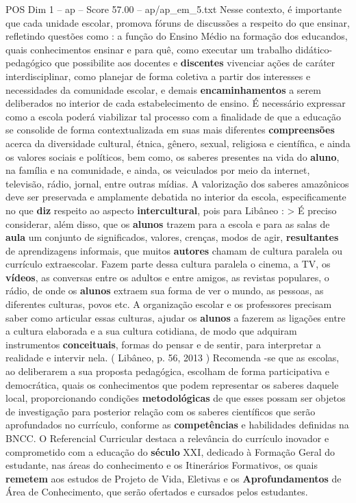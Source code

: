 \begin{textsample}{POS Dim 1 – ap – Score 57.00 – ap/ap\_em\_5.txt}
Nesse contexto, é importante que cada unidade escolar, promova fóruns de discussões a respeito do que ensinar, refletindo questões como : a função do Ensino Médio na formação dos educandos, quais conhecimentos ensinar e para quê, como executar um trabalho didático-pedagógico que possibilite aos docentes e \textbf{discentes} vivenciar ações de caráter interdisciplinar, como planejar de forma coletiva a partir dos interesses e necessidades da comunidade escolar, e demais \textbf{encaminhamentos} a serem deliberados no interior de cada estabelecimento de ensino.
É necessário expressar como a escola poderá viabilizar tal processo com a finalidade de que a educação se consolide de forma contextualizada em suas mais diferentes \textbf{compreensões} acerca da diversidade cultural, étnica, gênero, sexual, religiosa e científica, e ainda os valores sociais e políticos, bem como, os saberes presentes na vida do \textbf{aluno}, na família e na comunidade, e ainda, os veiculados por meio da internet, televisão, rádio, jornal, entre outras mídias.
A valorização dos saberes amazônicos deve ser preservada e amplamente debatida no interior da escola, especificamente no que \textbf{diz} respeito ao aspecto \textbf{intercultural}, pois para Libâneo : > É preciso considerar, além disso, que os \textbf{alunos} trazem para a escola e para as salas de \textbf{aula} um conjunto de significados, valores, crenças, modos de agir, \textbf{resultantes} de aprendizagens informais, que muitos \textbf{autores} chamam de cultura paralela ou currículo extraescolar.
Fazem parte dessa cultura paralela o cinema, a TV, os \textbf{vídeos}, as conversas entre os adultos e entre amigos, as revistas populares, o rádio, de onde os \textbf{alunos} extraem sua forma de ver o mundo, as pessoas, as diferentes culturas, povos etc.
A organização escolar e os professores precisam saber como articular essas culturas, ajudar os \textbf{alunos} a fazerem as ligações entre a cultura elaborada e a sua cultura cotidiana, de modo que adquiram instrumentos \textbf{conceituais}, formas do pensar e de sentir, para interpretar a realidade e intervir nela. ( Libâneo, p. 56, 2013 ) Recomenda -se que as escolas, ao deliberarem a sua proposta pedagógica, escolham de forma participativa e democrática, quais os conhecimentos que podem representar os saberes daquele local, proporcionando condições \textbf{metodológicas} de que esses possam ser objetos de investigação para posterior relação com os saberes científicos que serão aprofundados no currículo, conforme as \textbf{competências} e habilidades definidas na BNCC.
O Referencial Curricular destaca a relevância do currículo inovador e comprometido com a educação do \textbf{século} XXI, dedicado à Formação Geral do estudante, nas áreas do conhecimento e os Itinerários Formativos, os quais \textbf{remetem} aos estudos de Projeto de Vida, Eletivas e os \textbf{Aprofundamentos} de Área de Conhecimento, que serão ofertados e cursados pelos estudantes.

\end{textsample}
